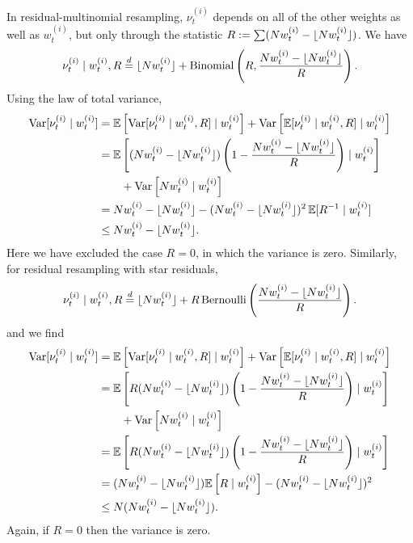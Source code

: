 In residual-multinomial resampling, $\nu_t^{(i)}$ depends on all of the other weights as well as $w_t^{(i)}$, but only through the statistic $R := \sum (N w_t^{(i)} - \lfloor N w_t^{(i)} \rfloor)$.
We have
\begin{equation*}
\nu_t^{(i)} \mid w_t^{(i)} , R
\overset{d}{=} \lfloor N w_t^{(i)} \rfloor + \operatorname{Binomial}\left( R, \frac{Nw_t^{(i)} - \lfloor N w_t^{(i)} \rfloor}{R} \right) .
\end{equation*}
Using the law of total variance,
\begin{align*}
\operatorname{Var}[ \nu_t^{(i)} \mid w_t^{(i)} ]
&= \mathbb{E}\left[ \operatorname{Var}[ \nu_t^{(i)} \mid w_t^{(i)}, R ] \mid w_t^{(i)} \right]
        + \operatorname{Var}\left[ \mathbb{E}[ \nu_t^{(i)} \mid w_t^{(i)}, R ] \mid w_t^{(i)} \right] \\
&= \mathbb{E}\left[ (Nw_t^{(i)} - \lfloor N w_t^{(i)} \rfloor) \left( 1- \frac{Nw_t^{(i)} - \lfloor N w_t^{(i)} \rfloor}{R} \right) 
        \mid w_t^{(i)} \right] \\
    &\qquad+ \operatorname{Var}\left[ Nw_t^{(i)} \mid w_t^{(i)} \right] \\
&= Nw_t^{(i)} - \lfloor N w_t^{(i)} \rfloor - (Nw_t^{(i)} - \lfloor N w_t^{(i)} \rfloor)^2\, \mathbb{E}[ R^{-1} \mid w_t^{(i)} ] \\
&\leq Nw_t^{(i)} - \lfloor N w_t^{(i)} \rfloor .
\end{align*}
Here we have excluded the case $R=0$, in which the variance is zero.
Similarly, for residual resampling with star residuals,
\begin{equation*}
\nu_t^{(i)} \mid w_t^{(i)} , R
\overset{d}{=} \lfloor N w_t^{(i)} \rfloor + R \operatorname{Bernoulli}\left( \frac{Nw_t^{(i)} - \lfloor N w_t^{(i)} \rfloor}{R} \right) .
\end{equation*}
and we find
\begin{align*}
\operatorname{Var}[ \nu_t^{(i)} \mid w_t^{(i)} ]
&= \mathbb{E}\left[ \operatorname{Var}[ \nu_t^{(i)} \mid w_t^{(i)}, R ] \mid w_t^{(i)} \right]
        + \operatorname{Var}\left[ \mathbb{E}[ \nu_t^{(i)} \mid w_t^{(i)}, R ] \mid w_t^{(i)} \right] \\
&= \mathbb{E}\left[ R (Nw_t^{(i)} - \lfloor N w_t^{(i)} \rfloor) \left( 1- \frac{Nw_t^{(i)} - \lfloor N w_t^{(i)} \rfloor}{R} \right) 
        \mid w_t^{(i)} \right] \\
    &\qquad+ \operatorname{Var}\left[ Nw_t^{(i)} \mid w_t^{(i)} \right] \\
&= \mathbb{E}\left[ R (Nw_t^{(i)} - \lfloor N w_t^{(i)} \rfloor) \left( 1- \frac{Nw_t^{(i)} - \lfloor N w_t^{(i)} \rfloor}{R} \right) 
        \mid w_t^{(i)} \right] \\
&= (Nw_t^{(i)} - \lfloor N w_t^{(i)} \rfloor) \mathbb{E}\left[ R \mid w_t^{(i)} \right]  - (Nw_t^{(i)} - \lfloor N w_t^{(i)} \rfloor)^2 \\
&\leq N (Nw_t^{(i)} - \lfloor N w_t^{(i)} \rfloor) .
\end{align*}
Again, if $R=0$ then the variance is zero.

